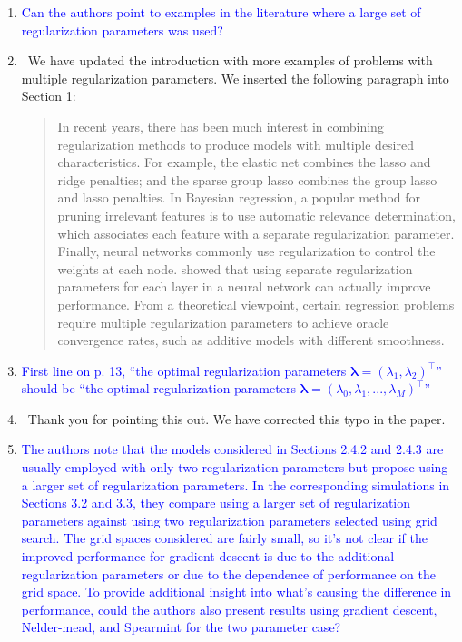 \documentclass[]{article}
\newcommand{\point}[1]{\item \textcolor{blue}{#1}}
\newcommand{\reply}{\item[]\ }
\begin{document}
	\begin{enumerate}
		\point{Can the authors point to examples in the literature where a large set of regularization parameters was used?}
		
		\reply We have updated the introduction with more examples of problems with multiple regularization parameters. We inserted the following paragraph into Section 1:
		
		\begin{quote}
			In recent years, there has been much interest in combining regularization methods to produce models with multiple desired characteristics. For example, the elastic net combines the lasso and ridge penalties; and the sparse group lasso  combines the group lasso and lasso penalties. In Bayesian regression, a popular method for pruning irrelevant features is to use automatic relevance determination, which associates each feature with a separate regularization parameter. Finally, neural networks commonly use regularization to control the weights at each node.  showed that using separate regularization parameters for each layer in a neural network can actually improve performance. From a theoretical viewpoint, certain regression problems require multiple regularization parameters to achieve oracle convergence rates, such as additive models with different smoothness.
		\end{quote}
		
		\point{First line on p. 13, ``the optimal regularization parameters $\boldsymbol{\lambda} = (\lambda_1,\lambda_2)^\top$'' should be ``the optimal regularization parameters $\boldsymbol{\lambda} = (\lambda_0, \lambda_1, ... , \lambda_M)^\top$''}
		
		\reply Thank you for pointing this out. We have corrected this typo in the paper.
		
		\point{The authors note that the models considered in Sections 2.4.2 and 2.4.3 are usually employed with only two regularization parameters but propose using a larger set of regularization parameters. In the corresponding simulations in Sections 3.2 and 3.3, they compare using a larger set of regularization parameters against using two regularization parameters selected using grid search. The grid spaces considered are fairly small, so it’s not clear if the improved performance for gradient descent is due to the additional regularization parameters or due to the dependence of performance on the grid space. To provide additional insight into what’s causing the difference in performance, could the authors also present results using gradient descent, Nelder-mead, and Spearmint for the two parameter case?}
		

\end{enumerate}
\end{document}
